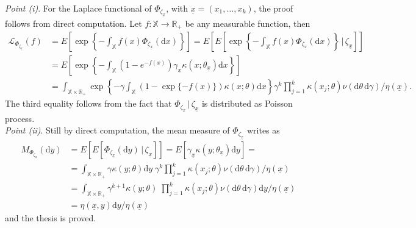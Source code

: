 \documentclass[11pt,a4paper,oneside]{article}
\newcommand{\dd}{\mathrm d}
\newcommand{\E}{E}
\newcommand{\X}{\mathbb{X}}
\newcommand{\R}{\mathbb{R}}
\renewcommand{\mid}{\ensuremath{\,|\,}}
\theoremstyle{definition}
\theoremstyle{remark}
\begin{document}
\emph{Point (i)}. For the Laplace functional of $\Phi_{\zeta_{\underline{x}}}$, with $\underline{x} = (x_1,\ldots,x_k)$, the proof follows from direct computation. Let $f:\X \to \R_+$ be any measurable function, then
\begin{equation*}
    \begin{aligned}
        \mathcal{L}_{\Phi_{\zeta_{\underline{x}}}}(f) &= \E\left[ \exp\left\{ - \int_{\X} f(x) \Phi_{\zeta_{\underline{x}}}(\dd x) \right\} \right] = \E\left[ \E \left[ \exp\left\{ - \int_{\X} f(x) \Phi_{\zeta_{\underline{x}}}(\dd x) \right\} \mid \zeta_{\underline{x}} \right] \right]\\
        &= \E\left[ \exp\left\{ - \int_{\X} (1 - e^{-f(x)}) \gamma_{\underline{x}} \kappa(x; \theta_{\underline{x}}) \dd x \right\}\right]\\
        &= \int_{\X\times\R_+} \exp\left\{ -\gamma \int_{\X} (1 - \exp\{- f(x)\}) \kappa(x;\theta) \dd x \right\} \gamma^k \prod_{j=1}^k \kappa(x_j; \theta)\nu(\dd \theta\, \dd \gamma) / \eta(\underline{x}).
    \end{aligned}
\end{equation*}
The third equality follows from the fact that $\Phi_{\zeta_{\underline{x}}}\mid \zeta_{\underline{x}}$ is distributed as Poisson process.\\

\emph{Point (ii)}. Still by direct computation, the mean measure of $\Phi_{\zeta_{\underline{x}}}$ writes as
\begin{equation*}
    \begin{aligned}
        M_{\Phi_{\zeta_{\underline{x}}}}(\dd y) &= \E\left[ \E\left[  \Phi_{\zeta_{\underline{x}}}(\dd y) \mid \zeta_{\underline{x}} \right] \right]
        = \E\left[ \gamma_{\underline{x}} \kappa(y; \theta_{\underline{x}}) \dd y \right] = \\
        &= \int_{\X\times \R_+} \gamma \kappa(y; \theta) \dd y \; \gamma^{k} \prod_{j=1}^k \kappa(x_j; \theta) \nu(\dd \theta \, \dd \gamma) / \eta(\underline{x})\\
        &=   \int_{\X\times \R_+} \gamma^{k+1} \kappa(y; \theta)  \; \prod_{j=1}^k \kappa(x_j; \theta) \nu(\dd \theta \, \dd \gamma) \dd y / \eta(\underline{x})\\
        &= \eta(\underline{x}, y) \dd y / \eta(\underline{x})
    \end{aligned}
\end{equation*}
and the thesis is proved.\\
\end{document}
